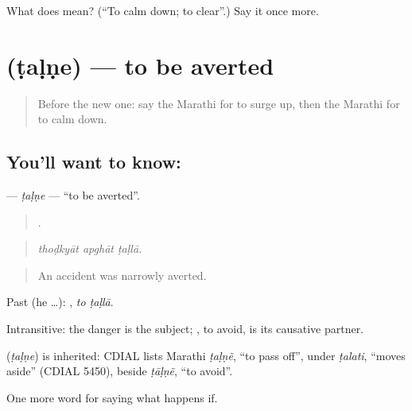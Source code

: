 \begin{tcolorbox}[breakable,colback=teal!4,colframe=teal!35!black,title={Before you move on}]
What does  mean? (\textquotedblleft{}To calm down; to clear\textquotedblright{}.) Say it once more.
\end{tcolorbox}
\section[\texorpdfstring{\mr{टळणे} (ṭaḷṇe)}{टळणे (ṭaḷṇe)}]{ (ṭaḷṇe) — to be averted}

\label{lesson:MR-C385-talne-averted}



\begin{quote}
Before the new one: say the Marathi for to surge up, then the Marathi for to calm down.
\end{quote}

\subsection*{You'll want to know: }
\textbf{} — \emph{ṭaḷṇe} — \textquotedblleft{}to be averted\textquotedblright{}.

\begin{quote}
  .
\end{quote}

\begin{quote}
\emph{thoḍkyāt apghāt ṭaḷlā.}
\end{quote}

\begin{quote}
An accident was narrowly averted.
\end{quote}

Past (he …):  , \emph{to ṭaḷlā}.

Intransitive: the danger is the subject; , to avoid, is its causative partner.

\begin{cousinweb}
\textbf{} (\emph{ṭaḷṇe}) is inherited: CDIAL lists Marathi \emph{ṭaḷṇẽ}, \textquotedblleft{}to pass off\textquotedblright{}, under \emph{ṭalati}, \textquotedblleft{}moves aside\textquotedblright{} (CDIAL 5450), beside \emph{ṭāḷṇẽ}, \textquotedblleft{}to avoid\textquotedblright{}.
\end{cousinweb}

\begin{grammarlens}[title={What you've built}]
One more word for saying what happens if.
\end{grammarlens}


